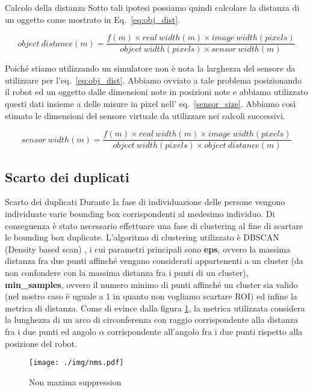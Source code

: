 \documentclass[10pt]{beamer}
\begin{document}
\begin{frame}[allowframebreaks]{Calcolo della distanza}
		Sotto tali ipotesi possiamo quindi calcolare la distanza di un oggetto
		come mostrato in Eq.~\ref{eq:obj_dist}.
		
		\begin{equation}\label{eq:obj_dist}
		object~distance(m) = 
		\frac{f(m) \times real~width(m) \times image~width(pixels)}
		{object~width(pixels) \times sensor~width(m)}
		\end{equation}
		
		Poiché stiamo utilizzando un simulatore non è nota la larghezza del
		sensore da utilizzare per l'eq.~\ref{eq:obj_dist}. Abbiamo ovviato a
		tale problema posizionando il robot ed un oggetto dalle dimensioni note
		in posizioni note e abbiamo utilizzato questi dati insieme a delle
		misure in pixel nell' eq.~\ref{sensor_size}. Abbiamo così stimato le
		dimensioni del sensore virtuale da utilizzare nei calcoli successivi.
		
		\begin{equation}\label{sensor_size}
		sensor~width(m) = 
		\frac{f(m) \times real~width(m) \times image~width(pixels)}
		{object~width(pixels) \times object~distance(m)}
		\end{equation}

	\end{frame}
	
	\subsection{Scarto dei duplicati}\label{subsec:Scarto-dei-duplicati}

	\begin{frame}[allowframebreaks]{Scarto dei duplicati}
		Durante la fase di individuazione delle persone vengono individuate
		varie bounding box corrispondenti al medesimo individuo. Di conseguenza
		è stato necessario effettuare una fase di clustering al fine di
		scartare le bounding box duplicate. L'algoritmo di clustering
		utilizzato è DBSCAN (Density based scan) \cite{dbscan}, i cui parametri
		principali sono \textbf{eps}, ovvero la massima distanza fra due punti
		affinché vengano considerati appartenenti a un cluster (da non
		confondere con la massima distanza fra i punti di un cluster),
		\textbf{min\_samples}, ovvero il numero minimo di punti affinché un
		cluster sia valido (nel nostro caso è uguale a 1 in quanto non vogliamo
		scartare ROI) ed infine la metrica di distanza.  Come di evince dalla
		figura \ref{fig:nms}, la metrica utilizzata considera la lunghezza di
		un arco di circonferenza con raggio corrispondente alla distanza fra i
		due punti ed angolo $\alpha$ corrispondente  all'angolo fra i due punti
		rispetto alla posizione del robot.
		
		\begin{figure}[H]
			\centering
			\texttt{[image: ./img/nms.pdf]}
			\caption{Non maxima suppression}
			\label{fig:nms}
		\end{figure}
	\end{frame}
\end{document}
